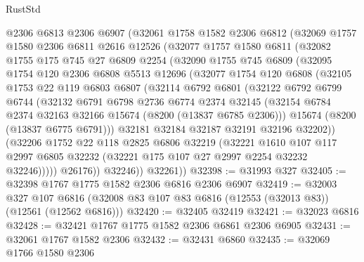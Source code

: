 \begin{lexlean}{RustStd}
\begin{coremodule}
    @2306
    @6813
    @2306
    @6907
    (@32061
      @1758
      @1582
      @2306
      @6812
      (@32069
        @1757
        @1580
        @2306
        @6811
        @2616
        @12526
        (@32077
          @1757
          @1580
          @6811
          (@32082
            @1755
            @175
            @745
            @27
            @6809
            @2254
            (@32090
              @1755
              @745
              @6809
              (@32095
                @1754
                @120
                @2306
                @6808
                @5513
                @12696
                (@32077
                  @1754
                  @120
                  @6808
                  (@32105
                    @1753
                    @22
                    @119
                    @6803
                    @6807
                    (@32114
                      @6792
                      @6801
                      (@32122
                        @6792
                        @6799
                        @6744
                        (@32132
                          @6791
                          @6798
                          @2736
                          @6774
                          @2374
                          @32145
                          (@32154 @6784 @2374 @32163 @32166 @15674 (@8200 (@13837 @6785 @2306)))
                          @15674
                          (@8200 (@13837 @6775 @6791)))
                        @32181
                        @32184
                        @32187
                        @32191
                        @32196
                        @32202))
                    (@32206
                      @1752
                      @22
                      @118
                      @2825
                      @6806
                      @32219
                      (@32221
                        @1610
                        @107
                        @117
                        @2997
                        @6805
                        @32232
                        (@32221 @175 @107 @27 @2997 @2254 @32232 @32246)))))
                @26176))
            @32246))
        @32261))
@32398 := @31993 @327
@32405 := @32398 @1767 @1775 @1582 @2306 @6816 @2306 @6907
@32419 := @32003
    @327
    @107
    @6816
    (@32008 @83 @107 @83 @6816 (@12553 (@32013 @83)) (@12561 (@12562 @6816)))
@32420 := @32405 @32419
@32421 := @32023 @6816
@32428 := @32421 @1767 @1775 @1582 @2306 @6861 @2306 @6905
@32431 := @32061 @1767 @1582 @2306
@32432 := @32431 @6860
@32435 := @32069 @1766 @1580 @2306

\end{coremodule}
\end{lexlean}
